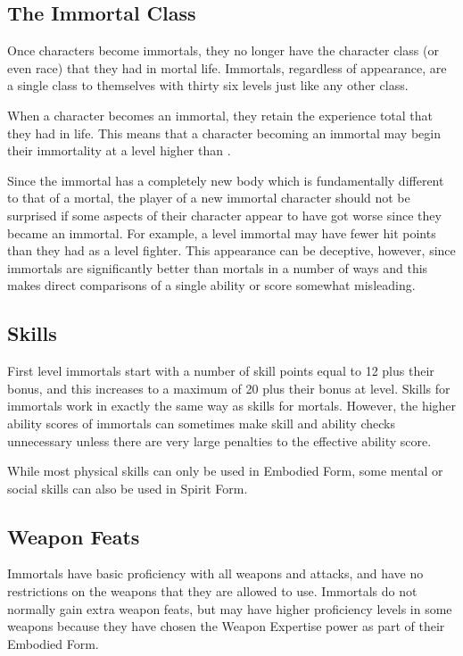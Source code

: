\begin{multicols*}{2}
\section{The Immortal Class}
Once characters become immortals, they no longer have the character class (or even race) that they had in mortal life. Immortals, regardless of appearance, are a single class to themselves with thirty six levels just like any other class.

When a character becomes an immortal, they retain the experience total that they had in life. This means that a character becoming an immortal may begin their immortality at a level higher than .

Since the immortal has a completely new body which is fundamentally different to that of a mortal, the player of a new immortal character should not be surprised if some aspects of their character appear to have got worse since they became an immortal. For example, a  level immortal may have fewer hit points than they had as a  level fighter. This appearance can be deceptive, however, since immortals are significantly better than mortals in a number of ways and this makes direct comparisons of a single ability or score somewhat misleading.

\subsection{Skills}
First level immortals start with a number of skill points equal to 12 plus their  bonus, and this increases to a maximum of 20 plus their  bonus at  level. Skills for immortals work in exactly the same way as skills for mortals. However, the higher ability scores of immortals can sometimes make skill and ability checks unnecessary unless there are very large penalties to the effective ability score.

While most physical skills can only be used in Embodied Form, some mental or social skills can also be used in Spirit Form.

\subsection{Weapon Feats}
Immortals have basic proficiency with all weapons and attacks, and have no restrictions on the weapons that they are allowed to use. Immortals do not normally gain extra weapon feats, but may have higher proficiency levels in some weapons because they have chosen the Weapon Expertise power as part of their Embodied Form.


\end{multicols*}
